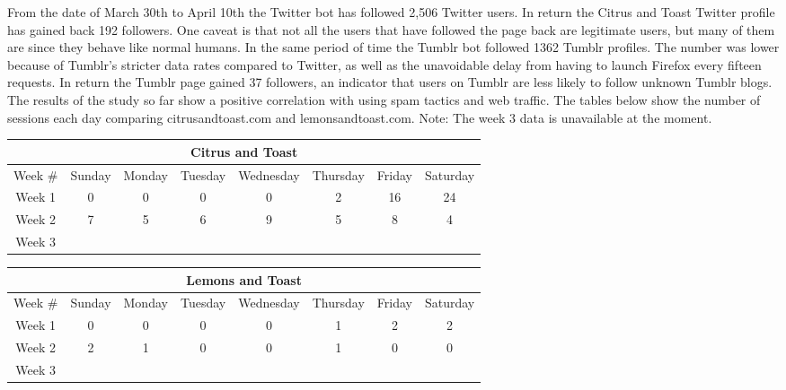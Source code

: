 \documentclass{article}
\begin{document}
From the date of March 30th to April 10th the Twitter bot has followed 2,506 Twitter users. In return the Citrus and Toast Twitter profile has gained back 192 followers. One caveat is that not all the users that have followed the page back are legitimate users, but many of them are since they behave like normal humans. In the same period of time the Tumblr bot followed 1362 Tumblr profiles. The number was lower because of Tumblr's stricter data rates compared to Twitter, as well as the unavoidable delay from having to launch Firefox every fifteen requests. In return the Tumblr page gained 37 followers, an indicator that users on Tumblr are less likely to follow unknown Tumblr blogs. 
\\
The results of the study so far show a positive correlation with using spam tactics and web traffic. The tables below show the number of sessions each day comparing citrusandtoast.com and lemonsandtoast.com. Note: The week 3 data is unavailable at the moment.
\newpage

\begin{adjustbox}{width=1.2\textwidth,center}
\begin{tabular}{| c | c | c | c | c | c | c | c |}
  \hline
  \multicolumn{8}{|c|}{Citrus and Toast} \\
  \hline
  Week \# & Sunday & Monday & Tuesday & Wednesday & Thursday & Friday & Saturday \\ 
  \hline
  Week 1 & 0 & 0 & 0 & 0 & 2 & 16 & 24 \\
  Week 2 & 7 & 5 & 6 & 9 & 5 & 8 & 4 \\
  Week 3 &  &  &  &  &  &  &  \\
  \hline
\end{tabular}
\end{adjustbox}

\vspace{0.5in}

\begin{adjustbox}{width=1.2\textwidth,center,caption={blah \\ blah}}
\begin{tabular}{| c | c | c | c | c | c | c | c |}
  \hline
  \multicolumn{8}{|c|}{Lemons and Toast} \\
  \hline
  Week \# & Sunday & Monday & Tuesday & Wednesday & Thursday & Friday & Saturday \\ 
  \hline
  Week 1 & 0 & 0 & 0 & 0 & 1 & 2 & 2 \\
  Week 2 & 2 & 1 & 0 & 0 & 1 & 0 & 0 \\
  Week 3 &  &  &  &  &  &  &  \\
  \hline
\end{tabular}
\end{adjustbox}
\end{document}

